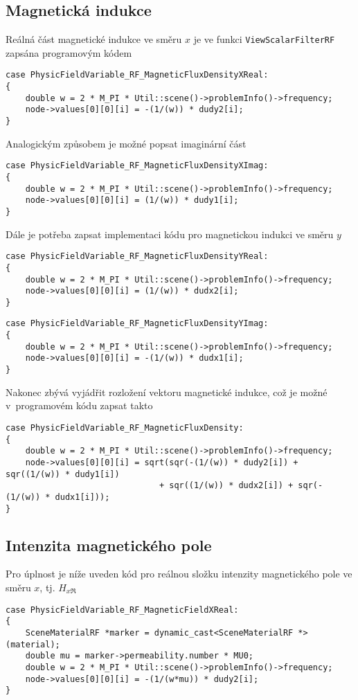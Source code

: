 \subsection*{Magnetická indukce}
Reálná část magnetické indukce ve směru $x$ je ve funkci \texttt{ViewScalarFilterRF} zapsána programovým kódem
\begin{verbatim}
case PhysicFieldVariable_RF_MagneticFluxDensityXReal:
{
    double w = 2 * M_PI * Util::scene()->problemInfo()->frequency;
    node->values[0][0][i] = -(1/(w)) * dudy2[i];
}
\end{verbatim}
Analogickým způsobem je možné popsat imaginární část
\begin{verbatim}
case PhysicFieldVariable_RF_MagneticFluxDensityXImag:
{
    double w = 2 * M_PI * Util::scene()->problemInfo()->frequency;
    node->values[0][0][i] = (1/(w)) * dudy1[i];
}    
\end{verbatim}
Dále je potřeba zapsat implementaci kódu pro magnetickou indukci ve směru $y$
\begin{verbatim}
case PhysicFieldVariable_RF_MagneticFluxDensityYReal:
{
    double w = 2 * M_PI * Util::scene()->problemInfo()->frequency;
    node->values[0][0][i] = (1/(w)) * dudx2[i];
}
\end{verbatim}
\begin{verbatim}
case PhysicFieldVariable_RF_MagneticFluxDensityYImag:
{
    double w = 2 * M_PI * Util::scene()->problemInfo()->frequency;
    node->values[0][0][i] = -(1/(w)) * dudx1[i];
}
\end{verbatim}
Nakonec zbývá vyjádřit rozložení vektoru magnetické indukce, což je možné v~programovém kódu zapsat takto
\begin{verbatim}
case PhysicFieldVariable_RF_MagneticFluxDensity:
{
    double w = 2 * M_PI * Util::scene()->problemInfo()->frequency;
    node->values[0][0][i] = sqrt(sqr(-(1/(w)) * dudy2[i]) + sqr((1/(w)) * dudy1[i])
                               + sqr((1/(w)) * dudx2[i]) + sqr(-(1/(w)) * dudx1[i]));
}
\end{verbatim}

\subsection*{Intenzita magnetického pole}
Pro úplnost je níže uveden kód pro reálnou složku intenzity magnetického pole ve směru $x$, tj. $H_{x\Re}$
\begin{verbatim}
case PhysicFieldVariable_RF_MagneticFieldXReal:
{
    SceneMaterialRF *marker = dynamic_cast<SceneMaterialRF *>(material);
    double mu = marker->permeability.number * MU0;
    double w = 2 * M_PI * Util::scene()->problemInfo()->frequency;
    node->values[0][0][i] = -(1/(w*mu)) * dudy2[i];
}
\end{verbatim}

